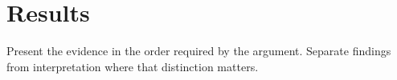 \section{Results}\label{sec:results}

Present the evidence in the order required by the argument. Separate findings
from interpretation where that distinction matters.
